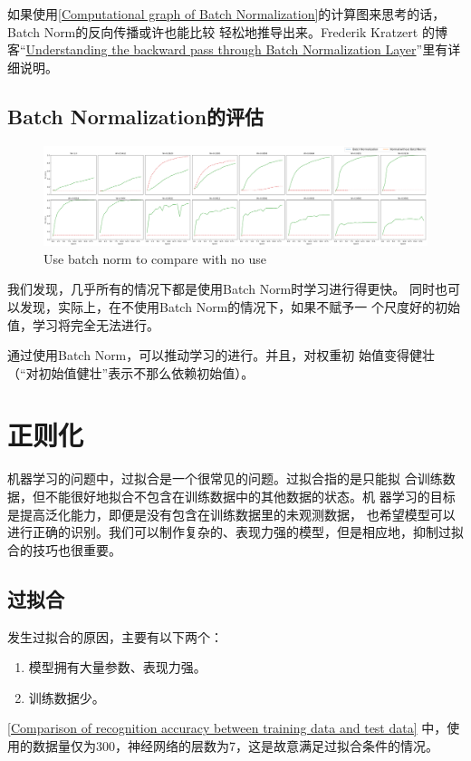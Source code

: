 如果使用\autoref{Computational graph of Batch Normalization}的计算图来思考的话，Batch Norm的反向传播或许也能比较
轻松地推导出来。Frederik Kratzert 的博客“\href{https://kratzert.github.io/2016/02/12/understanding-the-gradient-flow-through-the-batch-normalization-layer.html}{Understanding the backward pass through Batch Normalization Layer}”里有详细说明。

\subsection{Batch Normalization的评估}
\begin{figure}
    \centering
    \includegraphics[width=\textwidth]{Figures/Use batch norm to compare with no use.png}
    \caption{Use batch norm to compare with no use}
    \label{Use batch norm to compare with no use}
\end{figure}

我们发现，几乎所有的情况下都是使用Batch Norm时学习进行得更快。
同时也可以发现，实际上，在不使用Batch Norm的情况下，如果不赋予一
个尺度好的初始值，学习将完全无法进行。

通过使用Batch Norm，可以推动学习的进行。并且，对权重初
始值变得健壮（“对初始值健壮”表示不那么依赖初始值）。
\section{正则化}
机器学习的问题中，过拟合是一个很常见的问题。过拟合指的是只能拟
合训练数据，但不能很好地拟合不包含在训练数据中的其他数据的状态。机
器学习的目标是提高泛化能力，即便是没有包含在训练数据里的未观测数据，
也希望模型可以进行正确的识别。我们可以制作复杂的、表现力强的模型，但是相应地，抑制过拟合的技巧也很重要。
\subsection{过拟合}
发生过拟合的原因，主要有以下两个：
\begin{enumerate}
    \item 模型拥有大量参数、表现力强。
    \item 训练数据少。
\end{enumerate}
\autoref{Comparison of recognition accuracy between training data and test data} 中，使用的数据量仅为300，神经网络的层数为7，这是故意满足过拟合条件的情况。
